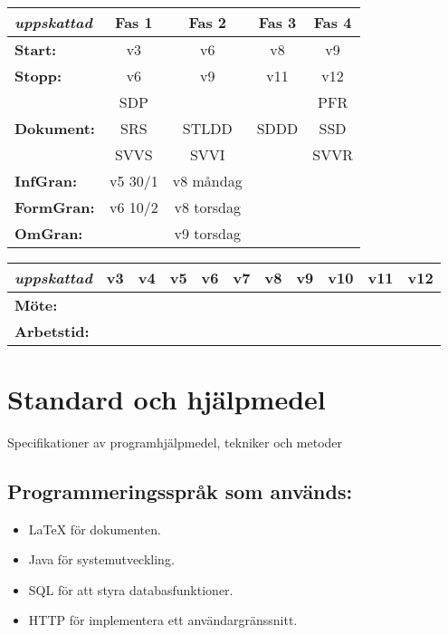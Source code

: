 \documentclass[paper=a4, fontsize=11pt,twoside]{article}
\begin{document}
{\color{red}{Jag har förslag på ett mall för en kalender vi kan sätta in för specifikt planering och vi kan hålla tabellerna till översiktsnivå, men vi kan diskutera det när vi har detaljerna}}\\
\begin{tabular}{| l | c | c | c | c |}
\hline
\textit{uppskattad} & \textbf{Fas 1} & \textbf{Fas 2} & \textbf{Fas 3} & \textbf{Fas 4}\\
\hline
\hline
\textbf{Start:} & v3 & v6 & v8 & v9 \\
\hline
\textbf{Stopp:} & v6 & v9 & v11 & v12 \\
\hline
 				& SDP & & & PFR \\
\textbf{Dokument:} & SRS & STLDD & SDDD & SSD \\
 				& SVVS & SVVI & & SVVR \\
\hline
\textbf{InfGran:} & v5 30/1 & v8 måndag & & \\
\hline
\textbf{FormGran:} & v6 10/2 & v8 torsdag & & \\
\hline
\textbf{OmGran:} & & v9 torsdag & & \\
\hline
\end{tabular}

\begin{tabular}{| l | c | c | c | c | c | c | c | c | c | c |}
\hline
\textit{uppskattad} & \textbf{v3} & \textbf{v4} & \textbf{v5} & \textbf{v6} & \textbf{v7} & \textbf{v8} & \textbf{v9} & \textbf{v10} & \textbf{v11} & \textbf{v12}\\
\hline
\textbf{Möte:} & & & & & & & & & & \\
\hline
\textbf{Arbetstid:} & & & & & & & & & & \\
\hline
\end{tabular}

\section{Standard och hjälpmedel}
Specifikationer av programhjälpmedel, tekniker och metoder

\subsection*{Programmeringsspråk som används:}
	\begin{itemize}
	\item LaTeX för dokumenten.
	\item Java för systemutveckling.
	\item SQL för att styra databasfunktioner.
	\item HTTP för implementera ett användargränssnitt.
	\end{itemize}
\end{document}
